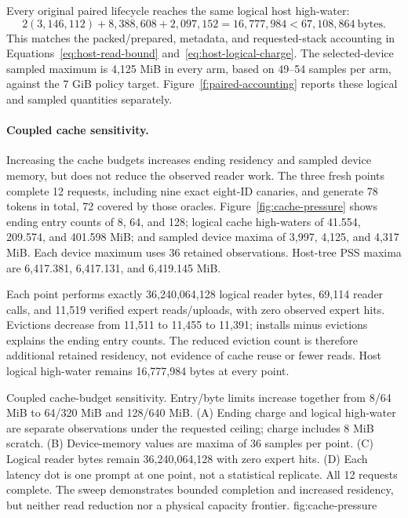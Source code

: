 Every original paired lifecycle reaches the same logical host high-water:
\begin{equation}
 2(3{,}146{,}112)+8{,}388{,}608+2{,}097{,}152
 =16{,}777{,}984<67{,}108{,}864\ \text{bytes}.
 \label{eq:qualified-host-charge}
\end{equation}
This matches the packed/prepared, metadata, and requested-stack accounting
in Equations~\ref{eq:host-read-bound} and~\ref{eq:host-logical-charge}.
The selected-device sampled maximum is 4,125 MiB in every arm, based on
49--54 samples per arm, against the 7 GiB policy target.
Figure~\ref{f:paired-accounting} reports these logical and sampled quantities
separately.

\paragraph{Coupled cache sensitivity.}
Increasing the cache budgets increases ending residency and sampled device
memory, but does not reduce the observed reader work. The three fresh points
complete 12 requests, including nine exact eight-ID canaries, and generate
78 tokens in total, 72 covered by those oracles. Figure~\ref{fig:cache-pressure}
shows ending entry counts of 8, 64, and 128; logical cache high-waters of
41.554, 209.574, and 401.598 MiB; and sampled device maxima of 3,997, 4,125,
and 4,317 MiB. Each device maximum uses 36 retained observations. Host-tree
PSS maxima are 6,417.381, 6,417.131, and 6,419.145 MiB.

Each point performs exactly 36,240,064,128 logical reader bytes, 69,114 reader
calls, and 11,519 verified expert reads/uploads, with zero observed expert
hits. Evictions decrease from 11,511 to 11,455 to 11,391; installs minus
evictions explains the ending entry counts. The reduced eviction count is
therefore additional retained residency, not evidence of cache reuse or fewer
reads. Host logical high-water remains 16,777,984 bytes at every point.

{Coupled cache-budget sensitivity. Entry/byte limits increase together from
8/64 MiB to 64/320 MiB and 128/640 MiB. (A) Ending charge and logical high-water
are separate observations under the requested ceiling; charge includes 8 MiB
scratch. (B) Device-memory values are maxima of 36 samples per point.
(C) Logical reader bytes remain 36,240,064,128 with zero expert hits.
(D) Each latency dot is one prompt at one point, not a statistical replicate.
All 12 requests complete. The sweep demonstrates bounded completion and
increased residency, but neither read reduction nor a physical capacity frontier.}
{fig:cache-pressure}


